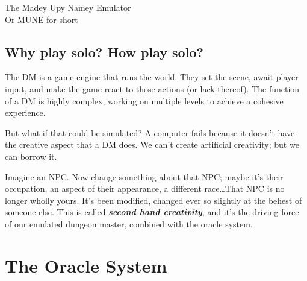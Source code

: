 \documentclass[12pt, letterpaper]{article}
\begin{document}
\sloppy

\begin{center}
{\Huge The Madey Upy Namey Emulator}\\[0.5em]
Or MUNE for short
\end{center}


\subsection*{Why play solo? How play solo?}

The DM is a game engine that runs the world. They set the scene, await player input, and make the game react to those actions (or lack thereof). The function of a DM is highly complex, working on multiple levels to achieve a cohesive experience.

But what if that could be simulated? A computer fails because it doesn't have the creative aspect that a DM does. We can't create artificial creativity; but we can borrow it.

Imagine an NPC. Now change something about that NPC; maybe it's their occupation, an aspect of their appearance, a different race\ldots That NPC is no longer wholly yours. It's been modified, changed ever so slightly at the behest of someone else. This is called \textbf{\textit{second hand creativity}}, and it's the driving force of our emulated dungeon master, combined with the oracle system.

\section*{The Oracle System}



\newsavebox{\oracletbl}
\end{document}

